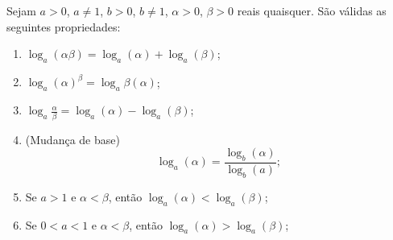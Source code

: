   Sejam $a> 0$, $a \neq 1$, $b> 0$, $b \neq 1$, $\alpha > 0$, $\beta > 0$ reais quaisquer. São válidas as seguintes propriedades:
  \begin{enumerate}
   \item $\log_{a}(\alpha\beta)=\log_{a}(\alpha) + \log_{a}(\beta)$;
   \item $\log_{a}(\alpha)^{\beta}=\log_{a}\beta(\alpha)$;
   \item $\log_{a}\frac{\alpha}{\beta}=\log_{a}(\alpha) - \log_{a}(\beta)$;
   \item (Mudança de base) \[\log_{a}(\alpha)=\frac{\log_{b}(\alpha)}{\log_{b}(a)};\]
   \item Se $a> 1$ e $\alpha < \beta$, então $\log_{a}(\alpha) < \log_{a}(\beta)$;
   \item Se $0 < a < 1$ e $\alpha < \beta$, então $\log_{a}(\alpha) > \log_{a}(\beta)$;
  \end{enumerate}

 \newpage
